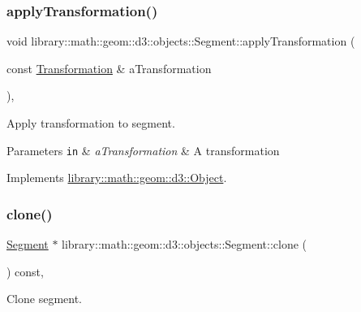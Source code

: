 \subsubsection{\texorpdfstring{apply\+Transformation()}{applyTransformation()}}
{\footnotesize\ttfamily void library\+::math\+::geom\+::d3\+::objects\+::\+Segment\+::apply\+Transformation (\begin{DoxyParamCaption}\item[{const \hyperlink{classlibrary_1_1math_1_1geom_1_1d3_1_1_transformation}{Transformation} \&}]{a\+Transformation }\end{DoxyParamCaption})\hspace{0.3cm}{\ttfamily [override]}, {\ttfamily [virtual]}}



Apply transformation to segment. 


\begin{DoxyParams}[1]{Parameters}
\mbox{\tt in}  & {\em a\+Transformation} & A transformation \\
\hline
\end{DoxyParams}


Implements \hyperlink{classlibrary_1_1math_1_1geom_1_1d3_1_1_object_a5fc47b1ee5d9a28efc6010d3d1512470}{library\+::math\+::geom\+::d3\+::\+Object}.

\mbox{\label{classlibrary_1_1math_1_1geom_1_1d3_1_1objects_1_1_segment_a589ad56339616f362cee84a2ecab61a4}} 
\subsubsection{\texorpdfstring{clone()}{clone()}}
{\footnotesize\ttfamily \hyperlink{classlibrary_1_1math_1_1geom_1_1d3_1_1objects_1_1_segment}{Segment} $\ast$ library\+::math\+::geom\+::d3\+::objects\+::\+Segment\+::clone (\begin{DoxyParamCaption}{ }\end{DoxyParamCaption}) const\hspace{0.3cm}{\ttfamily [override]}, {\ttfamily [virtual]}}



Clone segment. 


